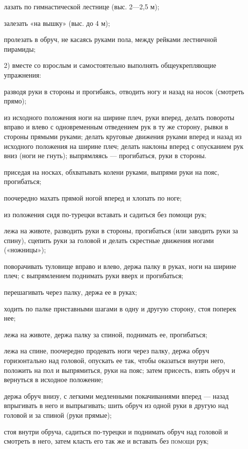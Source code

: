 \documentclass{book}
\begin{document}
лазать по гимнастической лестнице (выс. 2---2,5 м);

залезать «на вышку» (выс. до 4 м);

пролезать в обруч, не касаясь руками пола, между рейками лестничной
пирамиды;

2) вместе со взрослым и самостоятельно выполнять общеукрепляющие
упражнения:

разводя руки в стороны и прогибаясь, отводить ногу и назад на носок
(смотреть прямо);

из исходного положения ноги на ширине плеч, руки вперед, делать повороты
вправо и влево с одновременным отведением рук в ту же сторону, рывки в
стороны прямыми руками; делать круговые движения руками вперед и назад
из исходного положения на ширине плеч; делать наклоны вперед с
опусканием рук вниз (ноги не гнуть); выпрямляясь --- прогибаться, руки в
стороны.

приседая на носках, обхватывать колени руками, выпрями руки на пояс,
прогибаться;

поочередно махать прямой ногой вперед и хлопать по ноге;

из положения сидя по-турецки вставать и садиться без помощи рук;

лежа на животе, разводить руки в стороны, прогибаться (или заводить руки
за спину), сцепить руки за головой и делать скрестные движения ногами
(«ножницы»);

поворачивать туловище вправо и влево, держа палку в руках, ноги на
ширине плеч; с выпрямлением поднимать руки вверх и прогибаться;

перешагивать через палку, держа ее в руках;

ходить по палке приставными шагами в одну и другую сторону, стоя поперек
нее;

лежа на животе, держа палку за спиной, поднимать ее, прогибаться;

лежа на спине, поочередно продевать ноги через палку, держа обруч
горизонтально над головой, опускать ее так, чтобы оказаться внутри него,
положить на пол и выпрямиться, руки на пояс; затем присесть, взять обруч
и вернуться в исходное положение;

держа обруч внизу, с легкими медленными покачиваниями вперед --- назад
впрыгивать в него и выпрыгивать; шить обруч из одной руки в другую над
головой и за спиной (руки прямые);

стоя внутри обруча, садиться по-турецки и поднимать обруч над головой и
смотреть в него, затем класть его так же и вставать без \textsc{помощи}
рук;
\end{document}
